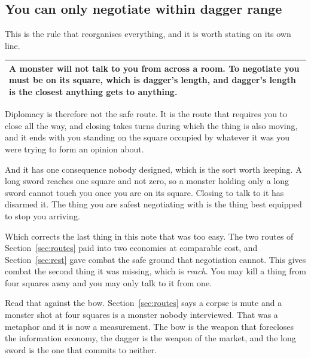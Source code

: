 \documentclass[11pt,a4paper]{article}
\begin{document}
\subsection{You can only negotiate within dagger range}

This is the rule that reorganises everything, and it is worth stating on its own line.

\begin{center}
\begin{tabular}{@{}>{\raggedright\arraybackslash}p{}@{}}
\toprule
\textbf{A monster will not talk to you from across a room. To negotiate you must be on its square,
which is dagger's length, and dagger's length is the closest anything gets to anything.} \\
\bottomrule
\end{tabular}
\end{center}

Diplomacy is therefore not the safe route. It is the route that requires you to close all the way,
and closing takes turns during which the thing is also moving, and it ends with you standing on the
square occupied by whatever it was you were trying to form an opinion about.

\begin{sectionbox}
And it has one consequence nobody designed, which is the sort worth keeping. A long sword reaches
one square and not zero, so a monster holding only a long sword cannot touch you once you are on
its square. Closing to talk to it has disarmed it. The thing you are safest negotiating with is
the thing best equipped to stop you arriving.
\end{sectionbox}

\begin{alarmbox}
Which corrects the last thing in this note that was too easy. The two routes of
Section~\ref{sec:routes} paid into two economies at comparable cost, and Section~\ref{sec:rest}
gave combat the safe ground that negotiation cannot. This gives combat the second thing it was
missing, which is \emph{reach}. You may kill a thing from four squares away and you may only talk
to it from one.
\end{alarmbox}

Read that against the bow. Section~\ref{sec:routes} says a corpse is mute and a monster shot at
four squares is a monster nobody interviewed. That was a metaphor and it is now a measurement. The
bow is the weapon that forecloses the information economy, the dagger is the weapon of the market,
and the long sword is the one that commits to neither.
\end{document}
